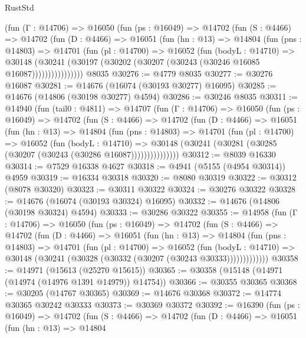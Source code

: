\begin{lexlean}{RustStd}
\begin{coremodule}
        (fun (Γ : @14706) =>
        @16050
          (fun (ps : @16049) =>
          @14702
            (fun (S : @4466) =>
            @14702
              (fun (D : @4466) =>
              @16051
                (fun (hn : @13) =>
                @14804
                  (fun (pns : @14803) =>
                  @14701
                    (fun (pl : @14700) =>
                    @16052
                      (fun (bodyL : @14710) =>
                      @30148
                        (@30241
                          (@30197 (@30202 (@30207 (@30243 (@30246 @16085 @16087))))))))))))))))
    @8035
@30276 := @4779 @8035
@30277 := @30276 @16087
@30281 := @14676 (@16074 (@30193 @30277) @16095)
@30285 := @14676 (@14806 (@30198 @30277) @4594)
@30286 := @30246 @8035
@30311 := @14940
    (fun (tail0 : @4811) =>
    @14707
      (fun (Γ : @14706) =>
      @16050
        (fun (ps : @16049) =>
        @14702
          (fun (S : @4466) =>
          @14702
            (fun (D : @4466) =>
            @16051
              (fun (hn : @13) =>
              @14804
                (fun (pns : @14803) =>
                @14701
                  (fun (pl : @14700) =>
                  @16052
                    (fun (bodyL : @14710) =>
                    @30148 (@30241 (@30281 (@30285 (@30207 (@30243 (@30286 @16087)))))))))))))))
@30312 := @8039 @16330
@30314 := @7529 @16338 @4627
@30318 := @4941 (@5155 (@4954 @30314)) @4959
@30319 := @16334 @30318
@30320 := @8080 @30319
@30322 := @30312 (@8078 @30320)
@30323 := @30311 @30322
@30324 := @30276 @30322
@30328 := @14676 (@16074 (@30193 @30324) @16095)
@30332 := @14676 (@14806 (@30198 @30324) @4594)
@30333 := @30286 @30322
@30355 := @14958
    (fun (Γ : @14706) =>
    @16050
      (fun (ps : @16049) =>
      @14702
        (fun (S : @4466) =>
        @14702
          (fun (D : @4466) =>
          @16051
            (fun (hn : @13) =>
            @14804
              (fun (pns : @14803) =>
              @14701
                (fun (pl : @14700) =>
                @16052
                  (fun (bodyL : @14710) =>
                  @30148 (@30241 (@30328 (@30332 (@30207 (@30243 @30333)))))))))))))
@30358 := @14971 (@15613 (@25270 @15615))
@30365 := @30358 (@15148 (@14971 (@14974 (@14976 @1391 @14979)) @14754))
@30366 := @30355 @30365
@30368 := @30205 (@14767 @30365)
@30369 := @14676 @30368
@30372 := @14774 @30365 @30242 @30333
@30373 := @30369 @30372
@30392 := @16390
    (fun (ps : @16049) =>
    @14702
      (fun (S : @4466) =>
      @14702
        (fun (D : @4466) =>
        @16051
          (fun (hn : @13) =>
          @14804

\end{coremodule}
\end{lexlean}
